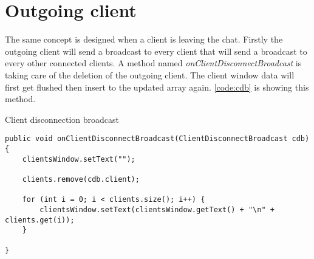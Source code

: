 \section{Outgoing client}
The same concept is designed when a client is leaving the chat. Firstly the outgoing client will send a broadcast to every client that will send a broadcast to every other connected clients. A method named \textit{onClientDisconnectBroadcast} is taking care of the deletion of the outgoing client. The client window data will first get flushed then insert to the updated array again. \cref{code:cdb} is showing this method.

\begin{listing}
\caption{Client disconnection broadcast}
\label{code:cdb}
\begin{verbatim}
public void onClientDisconnectBroadcast(ClientDisconnectBroadcast cdb) {
    clientsWindow.setText("");

    clients.remove(cdb.client);

    for (int i = 0; i < clients.size(); i++) {
        clientsWindow.setText(clientsWindow.getText() + "\n" + clients.get(i));
    }

}
\end{verbatim}
\end{listing}